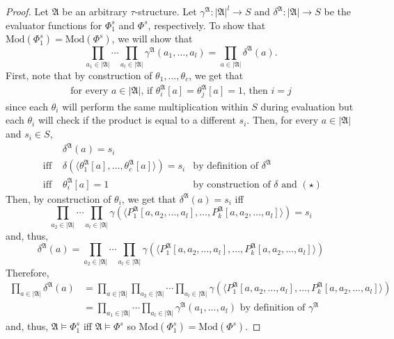 \documentclass[a4paper,UKenglish,cleveref, autoref, thm-restate, anonymous]{lipics-v2021}
\begin{document}
\begin{proof}
    Let $\mathfrak{A}$ be an arbitrary $\tau$-structure. Let $\gamma^\mathfrak{A} : |\mathfrak{A}|^l \rightarrow S$ and $\delta^\mathfrak{A} : |\mathfrak{A}| \rightarrow S$ be the evaluator functions for $\Phi^s_1$ and $\Phi^s$, respectively. To show that $\text{Mod}(\Phi^s_1) = \text{Mod}(\Phi^s)$, we will show that \[
        \prod_{a_1 \in |\mathfrak{A}|}\cdots\prod_{a_l \in |\mathfrak{A}|}\gamma^\mathfrak{A}(a_1,\dots,a_l) = \prod_{a \in |\mathfrak{A}|}\delta^\mathfrak{A}(a).
    \] 
    First, note that by construction of $\theta_1, \dots, \theta_c$, we get that \begin{align*}
        \text{for every $a \in |\mathfrak{A}|$, if $\theta_i^\mathfrak{A}[a] = \theta_j^\mathfrak{A}[a] = 1$, then $i = j$}\tag{$\star$}
    \end{align*} since each $\theta_i$ will perform the same multiplication within $S$ during evaluation but each $\theta_i$ will check if the product is equal to a different $s_i$. Then, for every $a \in |\mathfrak{A}|$ and $s_i \in S$,
    \begin{align*}
        &\delta^\mathfrak{A}(a) = s_i \\
        \text{ iff } &\delta(\langle \theta_1^\mathfrak{A}[a], \dots, \theta_c^\mathfrak{A}[a]\rangle) = s_i &\text{by definition of $\delta^\mathfrak{A}$}\\
        \text{ iff } &\theta_i^\mathfrak{A}[a] = 1 &\text{by construction of $\delta$ and $(\star)$}
    \end{align*}
    Then, by construction of $\theta_i$, we get that $\delta^\mathfrak{A}(a) = s_i$ iff \[
        \prod_{a_2 \in |\mathfrak{A}|}\cdots\prod_{a_l \in |\mathfrak{A}|}\gamma(\langle P_1^\mathfrak{A}[a, a_2, \dots, a_l], \dots, P_k^\mathfrak{A}[a, a_2, \dots, a_l] \rangle) = s_i
    \] and, thus, \[
        \delta^\mathfrak{A}(a) = \prod_{a_2 \in |\mathfrak{A}|}\cdots\prod_{a_l \in |\mathfrak{A}|}\gamma(\langle P_1^\mathfrak{A}[a, a_2, \dots, a_l], \dots, P_k^\mathfrak{A}[a, a_2, \dots, a_l] \rangle)
    \] Therefore, 
    \begin{align*}
        \prod_{a \in |\mathfrak{A}|}\delta^\mathfrak{A}(a)
        &=  \prod_{a \in |\mathfrak{A}|} \prod_{a_2 \in |\mathfrak{A}|}\cdots\prod_{a_l \in |\mathfrak{A}|}\gamma(\langle P_1^\mathfrak{A}[a, a_2, \dots, a_l], \dots, P_k^\mathfrak{A}[a, a_2, \dots, a_l] \rangle)\\
        &= \prod_{a_1 \in |\mathfrak{A}|}\cdots\prod_{a_l \in |\mathfrak{A}|}\gamma^\mathfrak{A}(a_1,\dots,a_l) \text{ by definition of $\gamma^\mathfrak{A}$}
    \end{align*}
    and, thus, $\mathfrak{A} \models \Phi^s_1$ iff $\mathfrak{A} \models \Phi^s$ so $\text{Mod}(\Phi^s_1) = \text{Mod}(\Phi^s)$.


\end{proof}
\end{document}
